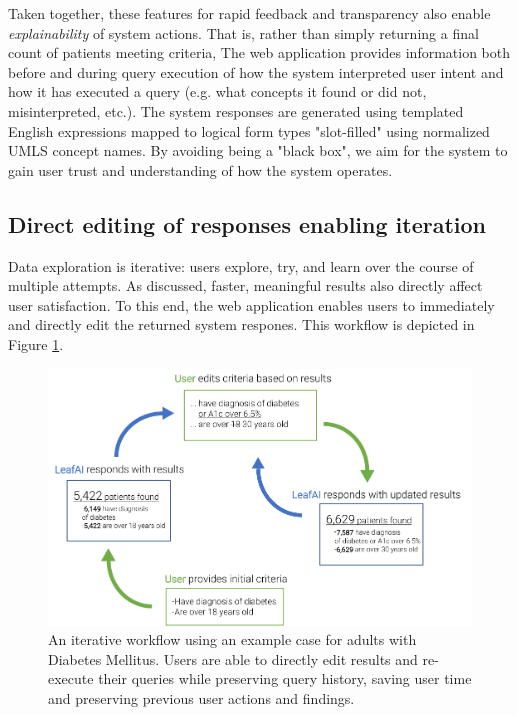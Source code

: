 \documentclass[../main.tex]{subfiles}
\begin{document}
Taken together, these features for rapid feedback and transparency also enable \textit{explainability} of system actions. That is, rather than simply returning a final count of patients meeting criteria, The web application provides information both before and during query execution of how the system interpreted user intent and how it has executed a query (e.g. what concepts it found or did not, misinterpreted, etc.). The system responses are generated using templated English expressions mapped to logical form types "slot-filled" using normalized UMLS concept names. By avoiding being a "black box", we aim for the system to gain user trust and understanding of how the system operates.

\subsection{Direct editing of responses enabling iteration}

Data exploration is iterative: users explore, try, and learn over the course of multiple attempts. As discussed, faster, meaningful results also directly affect user satisfaction. To this end, the web application enables users to immediately and directly edit the returned system respones. This workflow is depicted in Figure \ref{fig_leafai_feedback_loop}. 

\begin{figure}[h!]
  \centering
  \includegraphics[scale=1]{Figures/8_web_application/leafai_feedback_loop.pdf}  
  \caption{An iterative workflow using an example case for adults with Diabetes Mellitus. Users are able to directly edit results and re-execute their queries while preserving query history, saving user time and preserving previous user actions and findings.}
\label{fig_leafai_feedback_loop}
\end{figure}
\end{document}
